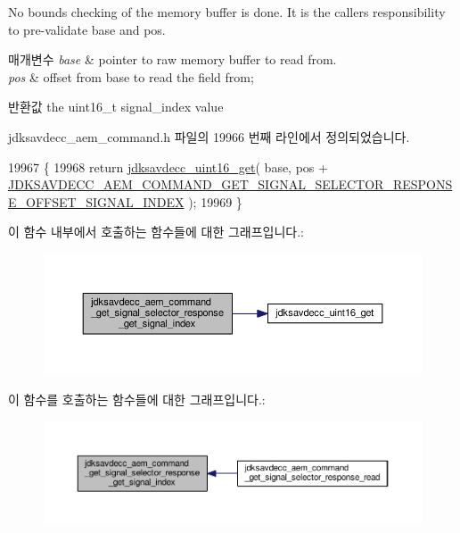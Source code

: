 No bounds checking of the memory buffer is done. It is the caller\textquotesingle{}s responsibility to pre-\/validate base and pos.


\begin{DoxyParams}{매개변수}
{\em base} & pointer to raw memory buffer to read from. \\
\hline
{\em pos} & offset from base to read the field from; \\
\hline
\end{DoxyParams}
\begin{DoxyReturn}{반환값}
the uint16\+\_\+t signal\+\_\+index value 
\end{DoxyReturn}


jdksavdecc\+\_\+aem\+\_\+command.\+h 파일의 19966 번째 라인에서 정의되었습니다.


\begin{DoxyCode}
19967 \{
19968     \textcolor{keywordflow}{return} \hyperlink{group__endian_ga3fbbbc20be954aa61e039872965b0dc9}{jdksavdecc\_uint16\_get}( base, pos + 
      \hyperlink{group__command__get__signal__selector__response_gac8ffe884ccd9a77b182d9d7862270487}{JDKSAVDECC\_AEM\_COMMAND\_GET\_SIGNAL\_SELECTOR\_RESPONSE\_OFFSET\_SIGNAL\_INDEX}
       );
19969 \}
\end{DoxyCode}


이 함수 내부에서 호출하는 함수들에 대한 그래프입니다.\+:
\nopagebreak
\begin{figure}[H]
\begin{center}
\leavevmode
\includegraphics[width=350pt]{group__command__get__signal__selector__response_ga249d162fe0b4e8ca2e11d50d8c0e81c7_cgraph}
\end{center}
\end{figure}




이 함수를 호출하는 함수들에 대한 그래프입니다.\+:
\nopagebreak
\begin{figure}[H]
\begin{center}
\leavevmode
\includegraphics[width=350pt]{group__command__get__signal__selector__response_ga249d162fe0b4e8ca2e11d50d8c0e81c7_icgraph}
\end{center}
\end{figure}


